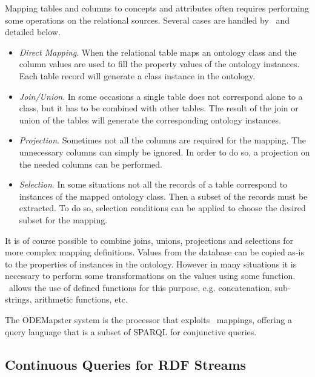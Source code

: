 Mapping tables and columns to concepts and attributes often requires performing some operations on the relational sources. Several cases are handled by \rtwoo\ and detailed below.
\begin{itemize}
\item \textit{Direct Mapping}. When the relational table maps an ontology class and the column values are used to fill the property values of the ontology instances. Each table record will generate a class instance in the ontology.
\item \textit{Join/Union}. In some occasions a single table does not correspond alone to a class, but it has to be combined with other tables. The result of the join or union of the tables will generate the corresponding ontology instances.
\item \textit{Projection}. Sometimes not all the columns are required for the mapping. The unnecessary columns can simply be ignored. In order to do so, a projection on the needed columns can be performed. %
\item \textit{Selection}. In some situations not all the records of a table correspond to instances of the mapped ontology class. Then a subset of the records must be extracted. To do so, selection conditions can be applied to choose the desired subset for the mapping.
\end{itemize}
It is of course possible to combine joins, unions, projections and selections for more complex mapping definitions.
Values from the database can be copied as-is to the properties of instances in the ontology. However in many situations
it is necessary to perform some transformations on the values using some function. \rtwoo\ allows the use of defined
functions for this purpose, e.g. concatenation, sub-strings, arithmetic functions, etc.

The ODEMapster \cite{Barrasa_04} system is the processor that exploits \rtwoo\ mappings, offering a query language that
is a subset of SPARQL for conjunctive queries.

\subsection{Continuous Queries for RDF Streams}
\label{rdfstreams}




